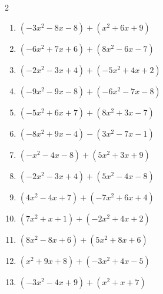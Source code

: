 \begin{multicols}{2}
\begin{enumerate}
  \item $(-3x^{2}-8x-8)+(x^{2}+6x+9)$


  \item $(-6x^{2}+7x+6)+(8x^{2}-6x-7)$


  \item $(-2x^{2}-3x+4)+(-5x^{2}+4x+2)$


  \item $(-9x^{2}-9x-8)+(-6x^{2}-7x-8)$


  \item $(-5x^{2}+6x+7)+(8x^{2}+3x-7)$


  \item $(-8x^{2}+9x-4)-(3x^{2}-7x-1)$


  \item $(-x^{2}-4x-8)+(5x^{2}+3x+9)$


  \item $(-2x^{2}-3x+4)+(5x^{2}-4x-8)$


  \item $(4x^{2}-4x+7)+(-7x^{2}+6x+4)$


\columnbreak %

\resetques

  \item $(7x^{2}+x+1)+(-2x^{2}+4x+2)$


  \item $(8x^{2}-8x+6)+(5x^{2}+8x+6)$


  \item $(x^{2}+9x+8)+(-3x^{2}+4x-5)$


  \item $(-3x^{2}-4x+9)+(x^{2}+x+7)$



\end{enumerate}
\end{multicols}
